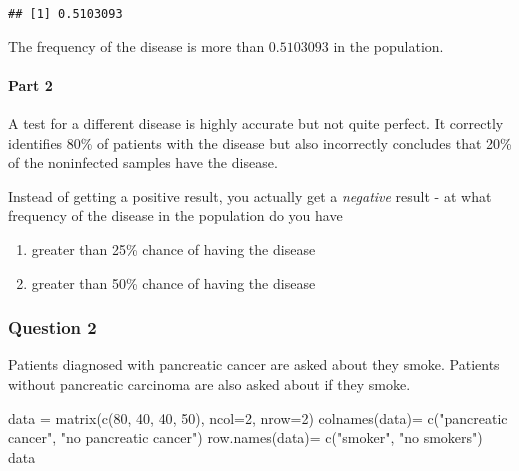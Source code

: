 \documentclass[
]{article}
\newenvironment{Shaded}{\begin{snugshade}}{\end{snugshade}}
\newcommand{\AttributeTok}[1]{\textcolor[rgb]{0.77,0.63,0.00}{#1}}
\newcommand{\DecValTok}[1]{\textcolor[rgb]{0.00,0.00,0.81}{#1}}
\newcommand{\FunctionTok}[1]{\textcolor[rgb]{0.00,0.00,0.00}{#1}}
\newcommand{\NormalTok}[1]{#1}
\newcommand{\OtherTok}[1]{\textcolor[rgb]{0.56,0.35,0.01}{#1}}
\newcommand{\StringTok}[1]{\textcolor[rgb]{0.31,0.60,0.02}{#1}}
\providecommand{\tightlist}{%
  \setlength{\itemsep}{0pt}\setlength{\parskip}{0pt}}
\begin{document}
\begin{verbatim}
## [1] 0.5103093
\end{verbatim}

The frequency of the disease is more than \(0.5103093\) in the
population.

\hypertarget{part-2}{%
\paragraph{Part 2}\label{part-2}}

A test for a different disease is highly accurate but not quite perfect.
It correctly identifies 80\% of patients with the disease but also
incorrectly concludes that 20\% of the noninfected samples have the
disease.

Instead of getting a positive result, you actually get a \emph{negative}
result - at what frequency of the disease in the population do you have

\begin{enumerate}
\def\labelenumi{\alph{enumi})}
\tightlist
\item
  greater than 25\% chance of having the disease
\item
  greater than 50\% chance of having the disease
\end{enumerate}

\hypertarget{question-2}{%
\subsubsection{Question 2}\label{question-2}}

Patients diagnosed with pancreatic cancer are asked about they smoke.
Patients without pancreatic carcinoma are also asked about if they
smoke.

\begin{Shaded}
\begin{Highlighting}[]
\NormalTok{data }\OtherTok{=} \FunctionTok{matrix}\NormalTok{(}\FunctionTok{c}\NormalTok{(}\DecValTok{80}\NormalTok{, }\DecValTok{40}\NormalTok{, }\DecValTok{40}\NormalTok{, }\DecValTok{50}\NormalTok{), }\AttributeTok{ncol=}\DecValTok{2}\NormalTok{, }\AttributeTok{nrow=}\DecValTok{2}\NormalTok{)}
\FunctionTok{colnames}\NormalTok{(data)}\OtherTok{=} \FunctionTok{c}\NormalTok{(}\StringTok{"pancreatic cancer"}\NormalTok{, }\StringTok{"no pancreatic cancer"}\NormalTok{)}
\FunctionTok{row.names}\NormalTok{(data)}\OtherTok{=} \FunctionTok{c}\NormalTok{(}\StringTok{"smoker"}\NormalTok{, }\StringTok{"no smokers"}\NormalTok{)}
\NormalTok{data}
\end{Highlighting}
\end{Shaded}
\end{document}
